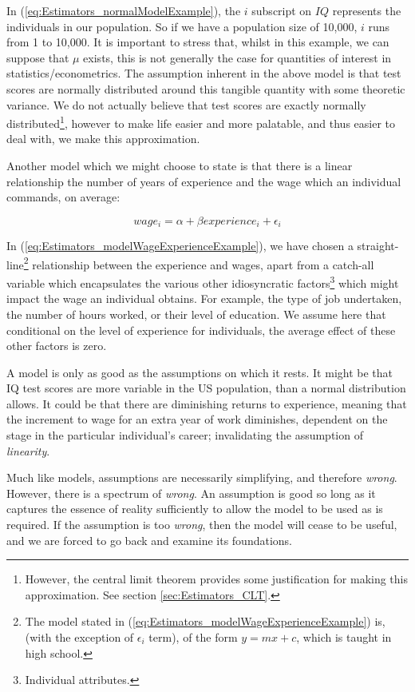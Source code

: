 \documentclass[11pt,fullpage]{book}
\begin{document}
In (\ref{eq:Estimators_normalModelExample}), the $i$ subscript on $IQ$ represents the individuals in our population. So if we have a population size of 10,000, $i$ runs from 1 to 10,000. It is important to stress that, whilst in this example, we can suppose that $\mu$ exists, this is not generally the case for quantities of interest in statistics/econometrics. The assumption inherent in the above model is that test scores are normally distributed around this tangible quantity with some theoretic variance. We do not actually believe that test scores are exactly normally distributed\footnote{However, the central limit theorem provides some justification for making this approximation. See section \ref{sec:Estimators_CLT}.}, however to make life easier and more palatable, and thus easier to deal with, we make this approximation. 

Another model which we might choose to state is that there is a linear relationship the number of years of experience and the wage which an individual commands, on average:

\begin{equation}\label{eq:Estimators_modelWageExperienceExample}
wage_i = \alpha + \beta experience_i + \epsilon_i
\end{equation}

In (\ref{eq:Estimators_modelWageExperienceExample}), we have chosen a straight-line\footnote{The model stated in (\ref{eq:Estimators_modelWageExperienceExample}) is, (with the exception of $\epsilon_i$ term), of the form $y = mx + c$, which is taught in high school.} relationship between the experience and wages, apart from a catch-all variable which encapsulates the various other idiosyncratic factors\footnote{Individual attributes.} which might impact the wage an individual obtains. For example, the type of job undertaken, the number of hours worked, or their level of education. We assume here that conditional on the level of experience for individuals, the average effect of these other factors is zero.

A model is only as good as the assumptions on which it rests. It might be that IQ test scores are more variable in the US population, than a normal distribution allows. It could be that there are diminishing returns to experience, meaning that the increment to wage for an extra year of work diminishes, dependent on the stage in the particular individual's career; invalidating the assumption of \textit{linearity}.

Much like models, assumptions are necessarily simplifying, and therefore \textit{wrong}. However, there is a spectrum of \textit{wrong}. An assumption is good so long as it captures the essence of reality sufficiently to allow the model to be used as is required. If the assumption is too \textit{wrong}, then the model will cease to be useful, and we are forced to go back and examine its foundations.
\end{document}
